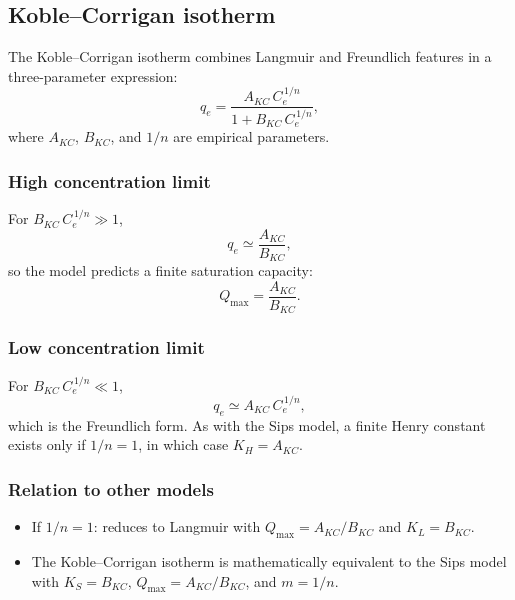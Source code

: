 \documentclass[12pt]{article}
\begin{document}
	\subsection{Koble--Corrigan isotherm}

	The Koble--Corrigan isotherm combines Langmuir and Freundlich
	features in a three-parameter expression:
	\begin{equation}
		q_e = \frac{A_{KC}\, C_e^{\,1/n}}{1 + B_{KC}\, C_e^{\,1/n}},
		\label{eq:KobleCorrigan}
	\end{equation}
	where $A_{KC}$, $B_{KC}$, and $1/n$ are empirical parameters.

	\subsubsection{High concentration limit}

	For $B_{KC}\,C_e^{\,1/n} \gg 1$,
	\begin{equation}
		q_e \simeq \frac{A_{KC}}{B_{KC}},
	\end{equation}
	so the model predicts a finite saturation capacity:
	\begin{equation}
		\boxed{Q_{\max} = \frac{A_{KC}}{B_{KC}}.}
	\end{equation}

	\subsubsection{Low concentration limit}

	For $B_{KC}\,C_e^{\,1/n} \ll 1$,
	\begin{equation}
		q_e \simeq A_{KC}\, C_e^{\,1/n},
	\end{equation}
	which is the Freundlich form. As with the Sips model, a finite
	Henry constant exists only if $1/n = 1$, in which case
	$K_H = A_{KC}$.

	\subsubsection{Relation to other models}

	\begin{itemize}
		\item If $1/n = 1$: reduces to Langmuir with
		$Q_{\max} = A_{KC}/B_{KC}$ and $K_L = B_{KC}$.
		\item The Koble--Corrigan isotherm is mathematically equivalent
		to the Sips model with $K_S = B_{KC}$, $Q_{\max} = A_{KC}/B_{KC}$,
		and $m = 1/n$.
	\end{itemize}
\end{document}
